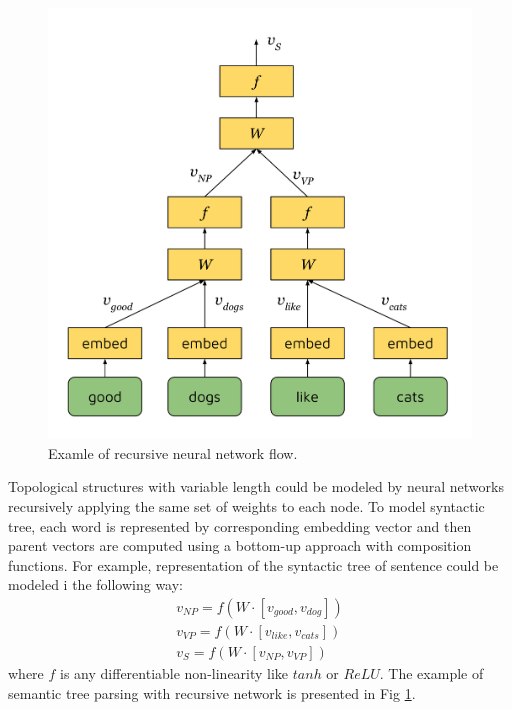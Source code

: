 \begin{figure}[h]
\centering
\includegraphics{Figures/rvnn}
\decoRule
\caption[RvNN flow]{Examle of recursive neural network flow.}
\label{fig:rvnn}
\end{figure}

Topological structures with variable length could be modeled by neural networks recursively applying the same set of weights to each node. To model syntactic tree, each word is represented by corresponding embedding vector and then parent vectors are computed using a bottom-up approach with composition functions. For example, representation of the syntactic tree of sentence  could be modeled i the following way:
\begin{equation}
\begin{split}
v_{NP} = f(W\cdot[v_{good}, v_{dog}])\\
v_{VP} = f(W\cdot[v_{like}, v_{cats}])\\
v_S = f(W\cdot[v_{NP}, v_{VP}])
\label{rvnn:example}
\end{split}
\end{equation}
where $f$ is any differentiable non-linearity like $tanh$ or $ReLU$. The example of semantic tree parsing with recursive network is presented in Fig \ref{fig:rvnn}.

